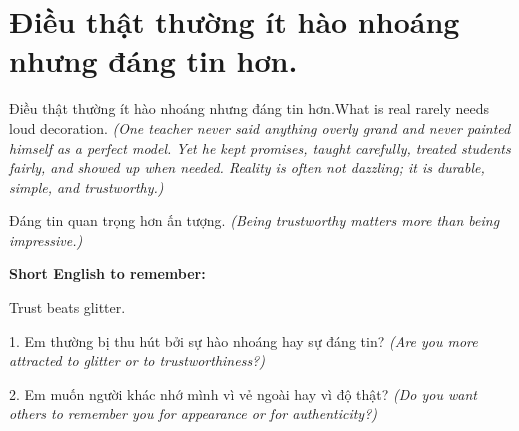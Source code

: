 \section{Điều thật thường ít hào nhoáng nhưng đáng tin hơn.}
\begin{truyen}{Điều thật thường ít hào nhoáng nhưng đáng tin hơn.}{What is real rarely needs loud decoration.}
\textit{(One teacher never said anything overly grand and never painted himself as a perfect model. Yet he kept promises, taught carefully, treated students fairly, and showed up when needed. Reality is often not dazzling; it is durable, simple, and trustworthy.)}
\end{truyen}
\begin{baihoc}
Đáng tin quan trọng hơn ấn tượng.
\textit{(Being trustworthy matters more than being impressive.)}
\end{baihoc}
\begin{ghinhoanh}
\textbf{Short English to remember:}

Trust beats glitter.
\end{ghinhoanh}
\begin{tuhocnhanh}
1. Em thường bị thu hút bởi sự hào nhoáng hay sự đáng tin? \textit{(Are you more attracted to glitter or to trustworthiness?)}

2. Em muốn người khác nhớ mình vì vẻ ngoài hay vì độ thật? \textit{(Do you want others to remember you for appearance or for authenticity?)}
\end{tuhocnhanh}
\ngancach
